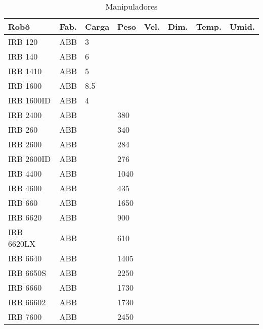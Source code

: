 \begin{longtable}{|p{}|p{}|p{}|p{}|p{}|p{}|p{}|p{}|}%

\caption{Manipuladores}
\label{tab::manip}
\endfirsthead
\endhead
\hline
Robô & Fab. & Carga & Peso & Vel. & Dim. & Temp. &
Umid.
\\
\hline IRB 120 & ABB & \cellcolor{red} 3 &  &  &  &  &  \\ \hline
IRB 140 & ABB & \cellcolor{red} 6 &  &  &  &  &  \\ \hline
IRB 1410 & ABB & \cellcolor{red} 5 &  &  &  &  &  \\ \hline
IRB 1600 & ABB & \cellcolor{red} 8.5 &  &  &  &  &  \\ \hline
IRB 1600ID & ABB & \cellcolor{red} 4 &  &  &  &  &  \\ \hline
IRB 2400 & ABB &  & \cellcolor{red} 380 &  &  &  &  \\ \hline
IRB 260 & ABB &  & \cellcolor{red} 340 &  &  &  &  \\ \hline
IRB 2600 & ABB &  & \cellcolor{red} 284 &  &  &  &  \\ \hline
IRB 2600ID & ABB &  & \cellcolor{red} 276 &  &  &  &  \\ \hline
IRB 4400 & ABB &  & \cellcolor{red} 1040 &  &  &  &  \\ \hline
IRB 4600 & ABB &  & \cellcolor{red} 435 &  &  &  &  \\ \hline
IRB 660 & ABB &  & \cellcolor{red} 1650 &  &  &  &  \\ \hline
IRB 6620 & ABB &  & \cellcolor{red} 900 &  &  &  &  \\ \hline
IRB 6620LX & ABB &  & \cellcolor{red} 610 &  &  &  &  \\ \hline
IRB 6640 & ABB &  & \cellcolor{red} 1405 &  &  &  &  \\ \hline
IRB 6650S & ABB &  & \cellcolor{red} 2250 &  &  &  &  \\ \hline
IRB 6660 & ABB &  & \cellcolor{red} 1730 &  &  &  &  \\ \hline
IRB 66602 & ABB &  & \cellcolor{red} 1730 &  &  &  &  \\ \hline
IRB 7600 & ABB &  & \cellcolor{red} 2450 &  &  &  &  \\ \hline

\end{longtable}
